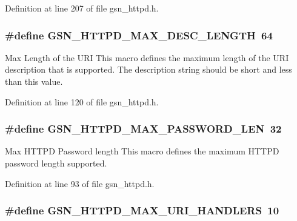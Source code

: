 Definition at line 207 of file gsn\_\-httpd.h.

\hypertarget{a00666_ga53602fa8c89b89819cae837fc8ba07cb}{
\subsubsection[{GSN\_\-HTTPD\_\-MAX\_\-DESC\_\-LENGTH}]{\setlength{\rightskip}{0pt plus 5cm}\#define GSN\_\-HTTPD\_\-MAX\_\-DESC\_\-LENGTH~64}}
\label{a00666_ga53602fa8c89b89819cae837fc8ba07cb}


Max Length of the URI This macro defines the maximum length of the URI description that is supported. The description string should be short and less than this value. 



Definition at line 120 of file gsn\_\-httpd.h.

\hypertarget{a00666_ga230f65ce2cb2f51b5a77ac10e8c41911}{
\subsubsection[{GSN\_\-HTTPD\_\-MAX\_\-PASSWORD\_\-LEN}]{\setlength{\rightskip}{0pt plus 5cm}\#define GSN\_\-HTTPD\_\-MAX\_\-PASSWORD\_\-LEN~32}}
\label{a00666_ga230f65ce2cb2f51b5a77ac10e8c41911}


Max HTTPD Password length This macro defines the maximum HTTPD password length supported. 



Definition at line 93 of file gsn\_\-httpd.h.

\hypertarget{a00666_ga57177849568fdcc8676db8fafcc80b74}{
\subsubsection[{GSN\_\-HTTPD\_\-MAX\_\-URI\_\-HANDLERS}]{\setlength{\rightskip}{0pt plus 5cm}\#define GSN\_\-HTTPD\_\-MAX\_\-URI\_\-HANDLERS~10}}
\label{a00666_ga57177849568fdcc8676db8fafcc80b74}


